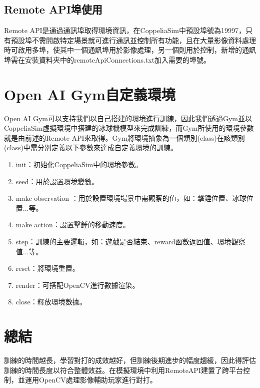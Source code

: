 \subsection{Remote API埠使用}
Remote API是通過通訊埠取得環境資訊，在CoppeliaSim中預設埠號為19997，只有預設埠不需開啟特定場景就可進行通訊並控制所有功能，且在大量影像資料處理時可啟用多埠，使其中一個通訊埠用於影像處理，另一個則用於控制，新增的通訊埠需在安裝資料夾中的remoteApiConnections.txt加入需要的埠號。\\
\section{Open AI Gym自定義環境}
Open AI Gym可以支持我們以自己搭建的環境進行訓練，因此我們透過Gym並以CoppeliaSim虛擬環境中搭建的冰球機模型來完成訓練，而Gym所使用的環境參數就是由前述的Remote API來取得。Gym將環境抽象為一個類別(class)在該類別(class)中需分別定義以下參數來達成自定義環境的訓練。\\

\begin{enumerate}
\item init：初始化CoppeliaSim中的環境參數。
\item seed：用於設置環境變數。
\item make observation ：用於設置環境場景中需觀察的值，如：擊錘位置、冰球位置...等。
\item make action：設置擊錘的移動速度。
\item step：訓練的主要邏輯，如：遊戲是否結束、reward函數返回值、環境觀察值...等。
\item reset：將環境重置。
\item render：可搭配OpenCV進行數據渲染。
\item close：釋放環境數據。
\end{enumerate}

\section{總結}
訓練的時間越長，學習對打的成效越好，但訓練後期進步的幅度趨緩，因此得評估訓練的時間長度以符合整體效益。在模擬環境中利用RemoteAPI建置了跨平台控制，並運用OpenCV處理影像輔助玩家進行對打。
\newpage
